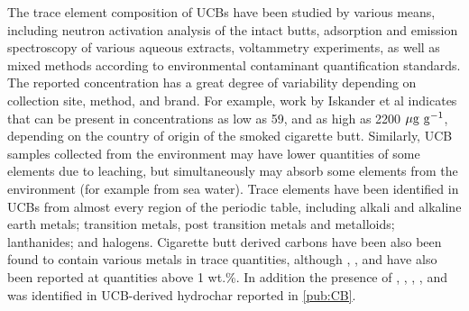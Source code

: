 The trace element composition of UCBs have been studied by various means, including neutron activation analysis of the intact butts,\citep{iskander1992multielement, Iskander1985, jenkins1985neutron, Wu1997} adsorption and emission spectroscopy of various aqueous extracts,\citep{MussaloRauhamaa1986, Kazi2009, Moriwaki2009, Moerman2011, Pelit2013, Dobaradaran2018} voltammetry experiments,\citep{Nitsch1991, Kalcher1993} as well as mixed methods according to environmental contaminant quantification standards.\citep{cardoso2018exposure} The reported concentration has a great degree of variability depending on collection site, method, and brand. For example, work by Iskander et al indicates that  can be present in concentrations as low as 59, and as high as 2200 $\rm{\mu g\ g^{-1}}$, depending on the country of origin of the smoked cigarette butt. Similarly, UCB samples collected from the environment\citep{Dobaradaran2017, Moriwaki2009, Moerman2011, chevalier2018nano} may have lower quantities of some elements due to leaching, but simultaneously may absorb some elements from the environment (for example from sea water). Trace elements have been identified in UCBs from almost every region of the periodic table, including alkali and alkaline earth metals;\cite{MussaloRauhamaa1986, Iskander1985, iskander1992multielement, jenkins1985neutron, Wu1997, cardoso2018exposure}  transition metals, post transition metals and metalloids;\citep{MussaloRauhamaa1986, Dobaradaran2017, Iskander1985, jenkins1985neutron, Wu1997, Moriwaki2009, Moerman2011, Pelit2013, Dobaradaran2018, Ren2017, cardoso2018exposure, chevalier2018nano} lanthanides;\citep{iskander1992multielement} and halogens.\citep{Iskander1985, iskander1992multielement, jenkins1985neutron, Wu1997} Cigarette butt derived carbons have been also been found to contain various metals in trace quantities,\citep{Soltani, Soltani2013, Yazdi2012} although , , and  have also been reported at quantities above 1 wt.\%.\citep{Soltani, Soltani2013, Yazdi2012, lima2018, Lee2014} In addition the presence of , , , , and  was identified in UCB-derived hydrochar reported in \ref{pub:CB}.

